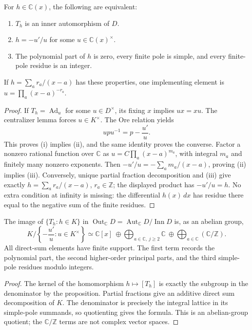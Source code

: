 \begin{proposition}
For \(h\in\mathbb C(x)\), the following are equivalent:
\begin{enumerate}[label=(\roman*)]
\item \(T_h\) is an inner automorphism of \(D\).
\item \(h=-u'/u\) for some \(u\in\mathbb C(x)^{\times}\).
\item The polynomial part of \(h\) is zero, every finite pole is simple,
and every finite-pole residue is an integer.
\end{enumerate}
If \(h=\sum_a r_a/(x-a)\) has these properties, one implementing element is
\(u=\prod_a(x-a)^{-r_a}\).
\end{proposition}
\begin{proof}
If \(T_h=\operatorname{Ad}_u\) for some \(u\in D^{\times}\), its fixing
\(x\) implies \(ux=xu\). The centralizer lemma forces \(u\in K^{\times}\).
The Ore relation yields
\[
 upu^{-1}=p-\frac{u'}u.
\]
This proves (i) implies (ii), and the same identity proves the converse.
Factor a nonzero rational function over \(\mathbb C\) as
\(u=C\prod_a(x-a)^{m_a}\), with integral \(m_a\) and finitely many nonzero
exponents. Then \(-u'/u=-\sum_a m_a/(x-a)\), proving (ii) implies (iii).
Conversely, unique partial fraction decomposition and (iii) give exactly
\(h=\sum_a r_a/(x-a)\), \(r_a\in\mathbb Z\); the displayed product has
\(-u'/u=h\). No extra condition at infinity is missing: the differential
\(h(x)\,dx\) has residue there equal to the negative sum of the finite
residues.
\end{proof}

\begin{corollary}
The image of \(\{T_h:h\in K\}\) in
\(\operatorname{Out}_{\mathbb C}D=\operatorname{Aut}_{\mathbb C}D/\operatorname{Inn}D\)
is, as an abelian group,
\[
 K\Big/\left\{-\frac{u'}u:u\in K^{\times}\right\}
 \simeq
 \mathbb C[x]\ \oplus\!\bigoplus_{a\in\mathbb C,\ j\ge2}\!\mathbb C
 \ \oplus\!\bigoplus_{a\in\mathbb C}\!(\mathbb C/\mathbb Z).
\]
All direct-sum elements have finite support. The first term records the
polynomial part, the second higher-order principal parts, and the third
simple-pole residues modulo integers.
\end{corollary}
\begin{proof}
The kernel of the homomorphism \(h\mapsto[T_h]\) is exactly the subgroup in
the denominator by the proposition. Partial fractions give an additive direct
sum decomposition of \(K\). The denominator is precisely the integral lattice
in its simple-pole summands, so quotienting gives the formula. This is an
abelian-group quotient; the \(\mathbb C/\mathbb Z\) terms are not complex
vector spaces.
\end{proof}

